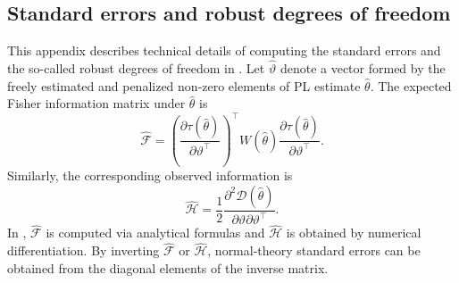 \documentclass[nojss]{jss}
\begin{document}
\begin{appendix}
\section{Standard errors and robust degrees of freedom} \label{app:technical}
This appendix describes technical details of computing the standard errors and the so-called robust degrees of freedom in . Let $\hat{\vartheta}$ denote a vector formed by the freely estimated and penalized non-zero elements of PL estimate $\hat{\theta}$. The expected Fisher information matrix under $\hat{\theta}$ is 
\begin{equation}
\widehat{\mathcal{F}} = \left( \frac{\partial \tau(\hat{\theta})}{\partial \vartheta^\top} \right)^\top W(\hat{\theta}) \frac{\partial \tau(\hat{\theta})}{\partial \vartheta^\top}.
\end{equation}
Similarly, the corresponding observed information is
\begin{equation}
\widehat{\mathcal{H}} = \frac{1}{2}
\frac{\partial^2 \mathcal{D}(\hat{\theta})}{\partial \vartheta \partial \vartheta^\top}.
\end{equation}
In , $\widehat{\mathcal{F}}$ is computed via analytical formulas and $\widehat{\mathcal{H}}$ is obtained by numerical differentiation. By inverting $\widehat{\mathcal{F}}$ or $\widehat{\mathcal{H}}$, normal-theory standard errors can be obtained from the diagonal elements of the inverse matrix.


\end{appendix}
\end{document}
